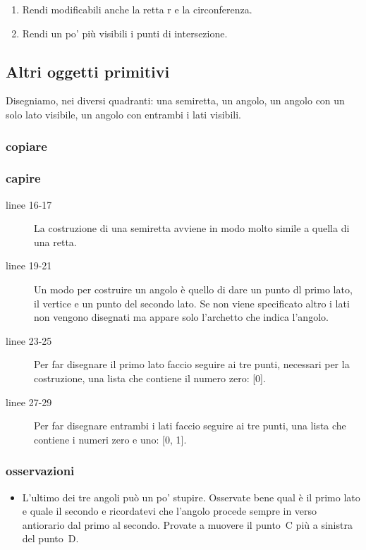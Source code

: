 \begin{enumerate} [noitemsep]
 \item Rendi modificabili anche la retta r e la circonferenza.
 \item Rendi un po' più visibili i punti di intersezione.
\end{enumerate}

\subsection{Altri oggetti primitivi}
\label{subsec:geo_int_altrioggetti}

Disegniamo, nei diversi quadranti: una semiretta, un angolo, un angolo con un 
solo lato visibile, un angolo con entrambi i lati visibili.

\subsubsection{copiare}



\subsubsection{capire}

\begin{description}
 \item [linee 16-17]
La costruzione di una semiretta avviene in modo molto simile a quella di una 
retta.
 \item [linee 19-21]
Un modo per costruire un angolo è quello di dare un punto dl primo lato, il 
vertice e un punto del secondo lato. Se non viene specificato altro i lati non 
vengono disegnati ma appare solo l'archetto che indica l'angolo.
 \item [linee 23-25]
Per far disegnare il primo lato faccio seguire ai tre punti, necessari per la 
costruzione, una lista che contiene il numero zero: [0].
 \item [linee 27-29]
Per far disegnare entrambi i lati faccio seguire ai tre punti, una lista che 
contiene i numeri zero e uno: [0, 1].
\end{description}

\subsubsection{osservazioni}

\begin{itemize}
 \item L'ultimo dei tre angoli può un po' stupire. Osservate bene qual è 
il primo lato 
e quale il secondo e ricordatevi che l'angolo procede sempre in verso 
antiorario dal primo al secondo. Provate a muovere il punto~C più a sinistra 
del punto~D.
\end{itemize}

